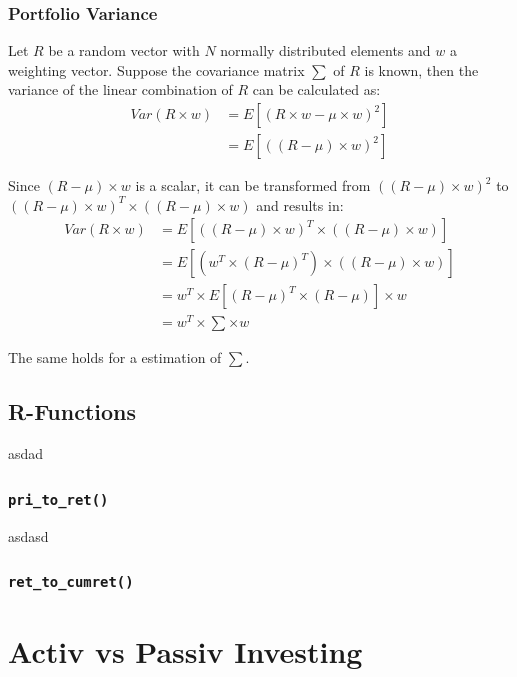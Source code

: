 \documentclass[
  oneside]{book}
\begin{document}
\hypertarget{portvar}{%
\subsection{Portfolio Variance}\label{portvar}}

Let \(R\) be a random vector with \(N\) normally distributed elements and \(w\) a weighting vector. Suppose the covariance matrix \(\sum\) of \(R\) is known, then the variance of the linear combination of \(R\) can be calculated as:
\begin{align*}
  Var(R \times w) &= E[(R \times w - \mu \times w)^2] \\
  &= E[((R - \mu) \times w)^2]
\end{align*}

Since \((R - \mu) \times w\) is a scalar, it can be transformed from \(((R - \mu) \times w)^2\) to \(((R - \mu) \times w)^T \times ((R - \mu) \times w)\) and results in:
\begin{align*}
  Var(R \times w) &= E[((R - \mu) \times w)^T \times ((R - \mu) \times w)]\\ 
  &= E[(w^T \times (R - \mu)^T) \times ((R - \mu) \times w)]\\ 
  &= w^T \times E[(R - \mu)^T \times (R - \mu)] \times w \\
  &= w^T \times \textstyle\sum \times w
\end{align*}

The same holds for a estimation of \(\textstyle\sum\).

\hypertarget{r-functions-2}{%
\section{R-Functions}\label{r-functions-2}}

asdad

\hypertarget{pritoret}{%
\subsection{\texorpdfstring{\texttt{pri\_to\_ret()}}{pri\_to\_ret()}}\label{pritoret}}

asdasd

\hypertarget{ret_to_cumret}{%
\subsection{\texorpdfstring{\texttt{ret\_to\_cumret()}}{ret\_to\_cumret()}}\label{ret_to_cumret}}

\hypertarget{activ-vs-passiv-investing}{%
\chapter{Activ vs Passiv Investing}\label{activ-vs-passiv-investing}}
\end{document}
